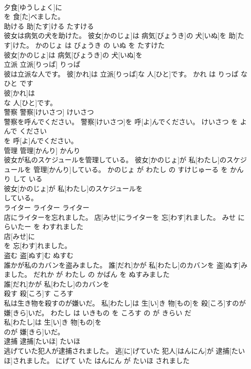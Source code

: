 \documentclass[8pt]{extreport}
\begin{document}
\begin{CJK}{UTF8}{min}
\\	夕食[ゆうしょく]に
\\	を 食[た]べました。			
\\	助ける	助[たす]ける	たすける	
\\	彼女は病気の犬を助けた。	彼女[かのじょ]は 病気[びょうき]の 犬[いぬ]を 助[たす]けた。	かのじょ は びょうき の いぬ を たすけた	
\\	彼女[かのじょ]は 病気[びょうき]の 犬[いぬ]を
\\	立派	立派[りっぱ]	りっぱ	
\\	彼は立派な人です。	彼[かれ]は 立派[りっぱ]な 人[ひと]です。	かれ は りっぱ な ひと です	
\\	彼[かれ]は
\\	な 人[ひと]です。			
\\	警察	警察[けいさつ]	けいさつ	
\\	警察を呼んでください。	警察[けいさつ]を 呼[よ]んでください。	けいさつ を よんで ください	
\\	を 呼[よ]んでください。			
\\	管理	管理[かんり]	かんり	
\\	彼女が私のスケジュールを管理している。	彼女[かのじょ]が 私[わたし]のスケジュールを 管理[かんり]している。	かのじょ が わたし の すけじゅーる を かんり して いる	
\\	彼女[かのじょ]が 私[わたし]のスケジュールを
\\	している。			
\\	ライター	ライター	ライター	
\\	店にライターを忘れました。	店[みせ]にライターを 忘[わす]れました。	みせ に らいたー を わすれました	
\\	店[みせ]に
\\	を 忘[わす]れました。			
\\	盗む	盗[ぬす]む	ぬすむ	
\\	誰かが私のカバンを盗みました。	誰[だれ]かが 私[わたし]のカバンを 盗[ぬす]みました。	だれか が わたし の かばん を ぬすみました	
\\	誰[だれ]かが 私[わたし]のカバンを
\\	殺す	殺[ころ]す	ころす	
\\	私は生き物を殺すのが嫌いだ。	私[わたし]は 生[い]き 物[もの]を 殺[ころ]すのが 嫌[きら]いだ。	わたし は いきもの を ころす の が きらい だ	
\\	私[わたし]は 生[い]き 物[もの]を
\\	のが 嫌[きら]いだ。			
\\	逮捕	逮捕[たいほ]	たいほ	
\\	逃げていた犯人が逮捕されました。	逃[に]げていた 犯人[はんにん]が 逮捕[たいほ]されました。	にげて いた はんにん が たいほ されました	

\end{CJK}
\end{document}
